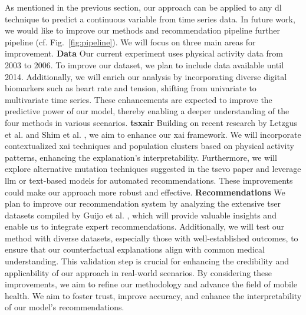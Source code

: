 As mentioned in the previous section, our approach can be applied to any \gls{dl} technique to predict a continuous variable from time series data. In future work, we would like to improve our methods and recommendation pipeline further pipeline (cf. Fig.~\ref{fig:pipeline}). We will focus on three main areas for improvement.
\textbf{Data} Our current experiment uses physical activity data from 2003 to 2006. To improve our dataset, we plan to include data available until 2014. Additionally, we will enrich our analysis by incorporating diverse digital biomarkers such as heart rate and tension, shifting from univariate to multivariate time series. These enhancements are expected to improve the predictive power of our model, thereby enabling a deeper understanding of the four methods in various scenarios. \textbf{\gls{tsxair}} Building on recent research by Letzgus et al. \cite{letzgus_toward_2022} and Shim et al. \cite{shim_wearable-based_2023}, we aim to enhance our \gls{xai} framework. We will incorporate contextualized \gls{xai} techniques and population clusters based on physical activity patterns, enhancing the explanation's interpretability.
Furthermore, we will explore alternative mutation techniques suggested in the \gls{tsevo} paper and leverage \gls{llm} or text-based models for automated recommendations. These improvements could make our approach more robust and effective. \textbf{Recommendations} We plan to improve our recommendation system by analyzing the extensive \gls{tser} datasets compiled by Guijo et al. \cite{guijo-rubio_unsupervised_2023}, which will provide valuable insights and enable us to integrate expert recommendations. Additionally, we will test our method with diverse datasets, especially those with well-established outcomes, to ensure that our counterfactual explanations align with common medical understanding. This validation step is crucial for enhancing the credibility and applicability of our approach in real-world scenarios.
By considering these improvements, we aim to refine our methodology and advance the field of mobile health. We aim to foster trust, improve accuracy, and enhance the interpretability of our model's recommendations.